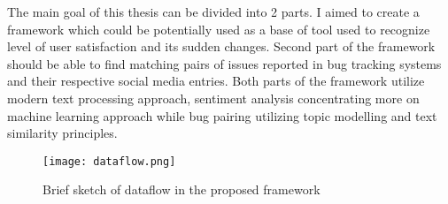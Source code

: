 The main goal of this thesis can be divided into 2 parts. I aimed to create a framework which could be potentially used as a base of tool used to recognize level of user satisfaction and its sudden changes. Second part of the framework should be able to find matching pairs of issues reported in bug tracking systems and their respective social media entries. Both parts of the framework utilize modern text processing approach, sentiment analysis concentrating more on machine learning approach while bug pairing utilizing topic modelling and text similarity principles.

\begin{figure}[H]%
    \centering
	\texttt{[image: dataflow.png]}
    \caption{Brief sketch of dataflow in the proposed framework}%
    \label{fig:frameworkDataflow}%
\end{figure}

